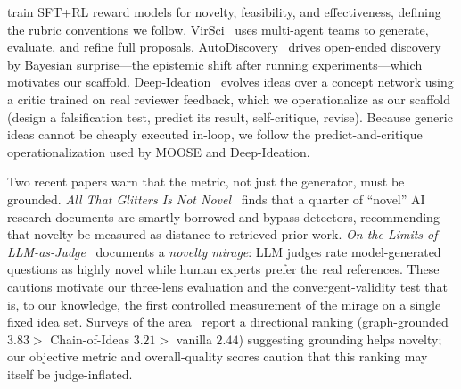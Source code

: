  \citet{dynamiccontrol2024} train SFT+RL reward models for novelty, feasibility, and effectiveness, defining the rubric conventions we follow. VirSci~\citep{virsci2024} uses multi-agent teams to generate, evaluate, and refine full proposals. AutoDiscovery~\citep{autodiscovery2025} drives open-ended discovery by Bayesian surprise---the epistemic shift after running experiments---which motivates our \outcome scaffold. Deep-Ideation~\citep{deepideation2025} evolves ideas over a concept network using a critic trained on real reviewer feedback, which we operationalize as our \smallexp scaffold (design a falsification test, predict its result, self-critique, revise). Because generic ideas cannot be cheaply executed in-loop, we follow the predict-and-critique operationalization used by MOOSE and Deep-Ideation.

 Two recent papers warn that the metric, not just the generator, must be grounded. \emph{All That Glitters Is Not Novel}~\citep{glitters2025} finds that a quarter of ``novel'' AI research documents are smartly borrowed and bypass detectors, recommending that novelty be measured as distance to retrieved prior work. \emph{On the Limits of LLM-as-Judge}~\citep{rqbench2026} documents a \emph{novelty mirage}: LLM judges rate model-generated questions as highly novel while human experts prefer the real references. These cautions motivate our three-lens evaluation and the convergent-validity test that is, to our knowledge, the first controlled measurement of the mirage on a single fixed idea set. Surveys of the area~\citep{survey2025a,survey2025b} report a directional ranking (graph-grounded $3.83 >$ Chain-of-Ideas $3.21 >$ vanilla $2.44$) suggesting grounding helps novelty; our objective metric and overall-quality scores caution that this ranking may itself be judge-inflated.
